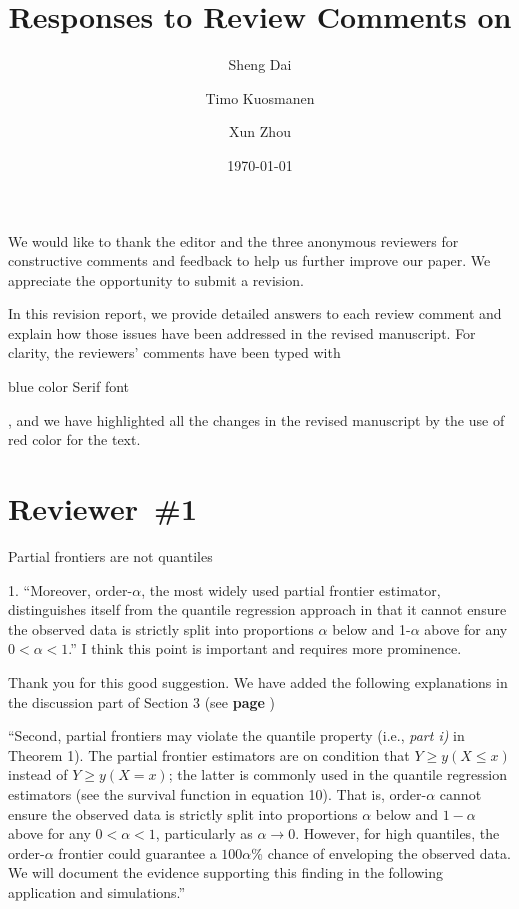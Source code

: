 \documentclass[12pt]{article}
\title{Responses to Review Comments on \PaperTitle{Partial frontiers are not quantiles} \meta{EJOR-D-22-01411}\\
  \vspace{0.5em} \large 
  }
\author{Sheng Dai \and Timo Kuosmanen \and Xun Zhou}
\date{\today}
\newcommand{\np}{\vskip 0.3cm}
\begin{document}


\baselineskip 20pt

We would like to thank the editor and the three anonymous reviewers for constructive comments and feedback to help us further improve our paper. We appreciate the opportunity to submit a revision. \np

In this revision report, we provide detailed answers to each review comment and explain how those issues have been addressed in the revised manuscript. For clarity, the reviewers' comments have been typed with {\blueb \begin{sf}blue color Serif font\end{sf}}, and we have highlighted all the changes in the revised manuscript by the use of {\color{red}red color} for the text. \np


\newpage
\section*{Reviewer~\#1}

\begin{sf}

{\blueb Partial frontiers are not quantiles\np

1. ``Moreover, order-$\alpha$, the most widely used partial frontier estimator, distinguishes itself from the quantile regression approach in that it cannot ensure the observed data is strictly split into proportions $\alpha$ below and 1-$\alpha$ above for any $0 < \alpha < 1$.'' I think this point is important and requires more prominence. \np
}
\end{sf}
\begin{response}
Thank you for this good suggestion. We have added the following explanations in the discussion part of Section 3 (see \textbf{page })\np

``Second, partial frontiers may violate the quantile property (i.e., \textit{part i)} in Theorem 1). The partial frontier estimators are on condition that $Y \ge y (X \le x)$ instead of $Y \ge y (X = x)$; the latter is commonly used in the quantile regression estimators (see the survival function in equation 10). That is, order-$\alpha$ cannot ensure the observed data is strictly split into proportions $\alpha$ below and $1-\alpha$ above for any $0< \alpha <1$, particularly as $\alpha \rightarrow 0$. However, for high quantiles, the order-$\alpha$ frontier could guarantee a $100\alpha$\% chance of enveloping the observed data. We will document the evidence supporting this finding in the following application and simulations.''
\end{response}
\end{document}
